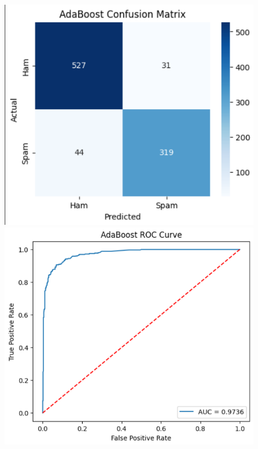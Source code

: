 \documentclass[12pt]{article}
\begin{document}
\begin{figure}[H]
\centering

\begin{minipage}{0.45\textwidth}
\centering
\includegraphics[width=\linewidth]{30.png}
\end{minipage}
\hfill
\begin{minipage}{0.45\textwidth}
\centering
\includegraphics[width=\linewidth]{31.png}
\end{minipage}
\end{figure}
\end{document}

